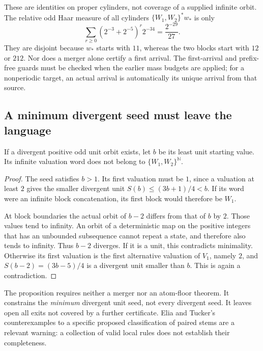 These are identities on proper cylinders, not coverage of a supplied
infinite orbit. The relative odd Haar measure of all cylinders
$\{W_1,W_2\}^*w_*$ is only
\[
 \sum_{r\ge0}(2^{-3}+2^{-5})^r2^{-34}
 =\frac{2^{-29}}{27}.
\]
They are disjoint because $w_*$ starts with $11$, whereas the two
blocks start with $12$ or $212$. Nor does a merger alone certify a
first arrival. The first-arrival and prefix-free guards must be checked
when the earlier mass budgets are applied; for a nonperiodic target,
an actual arrival is automatically its unique arrival from that source.

\subsection{A minimum divergent seed must leave the language}

\begin{proposition}
\label{pp:minimum-exit}
If a divergent positive odd unit orbit exists, let $b$ be its least
unit starting value. Its infinite valuation word does not belong to
$\{W_1,W_2\}^{\mathbb N}$.
\end{proposition}
\begin{proof}
The seed satisfies $b>1$. Its first valuation must be $1$, since a
valuation at least $2$ gives the smaller divergent unit
$S(b)\le(3b+1)/4<b$. If its word were an infinite block concatenation,
its first block would therefore be $W_1$.

At block boundaries the actual orbit of $b-2$ differs from that of $b$
by $2$. Those values tend to infinity. An orbit of a deterministic map
on the positive integers that has an unbounded subsequence cannot
repeat a state, and therefore also tends to infinity. Thus $b-2$
diverges. If it is a unit, this contradicts minimality. Otherwise its
first valuation is the first alternative valuation of $V_1$, namely
$2$, and $S(b-2)=(3b-5)/4$ is a divergent unit smaller than $b$.
This is again a contradiction.
\end{proof}

The proposition requires neither a merger nor an atom-floor theorem.
It constrains the \emph{minimum} divergent unit seed, not every
divergent seed. It leaves open all exits not covered by a further
certificate. Elia and Tucker's counterexamples to a specific proposed
classification of paired stems \cite{eliatucker2015} are a relevant
warning: a collection of valid local rules does not establish their
completeness.

